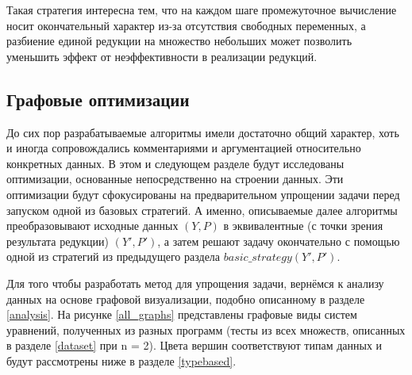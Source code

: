 \documentclass[../thesis.tex]{subfiles}
\begin{document}
Такая стратегия интересна тем, что на каждом шаге промежуточное вычисление носит окончательный характер из-за отсутствия свободных переменных, а разбиение единой редукции на множество небольших может позволить уменьшить эффект от неэффективности в реализации редукций.

\subsection{Графовые оптимизации}\label{graphbased}

До сих пор разрабатываемые алгоритмы имели достаточно общий характер, хоть и иногда сопровождались комментариями и аргументацией относительно конкретных данных. В этом и следующем разделе будут исследованы оптимизации, основанные непосредственно на строении данных. Эти оптимизации будут сфокусированы на предварительном упрощении задачи перед запуском одной из базовых стратегий. А именно, описываемые далее алгоритмы преобразовывают исходные данных $(Y, P)$ в эквивалентные (с точки зрения результата редукции) $(Y', P')$, а затем решают задачу окончательно с помощью одной из стратегий из предыдущего раздела $basic\_strategy(Y', P')$.

Для того чтобы разработать метод для упрощения задачи, вернёмся к анализу данных на основе графовой визуализации, подобно описанному в разделе \ref{analysis}. На рисунке \ref{all_graphs} представлены графовые виды систем уравнений, полученных из разных программ (тесты из всех множеств, описанных в разделе \ref{dataset} при n = 2). Цвета вершин соответствуют типам данных и будут рассмотрены ниже в разделе \ref{typebased}.

\captionsetup{justification   = raggedright,
              singlelinecheck = false}
\end{document}
